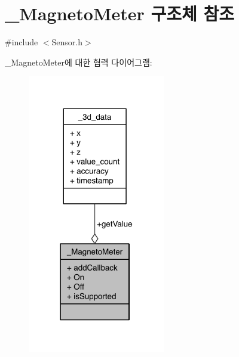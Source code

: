 \hypertarget{struct___magneto_meter}{\section{\-\_\-\-Magneto\-Meter 구조체 참조}
\label{struct___magneto_meter}
}


{\ttfamily \#include $<$Sensor.\-h$>$}



\-\_\-\-Magneto\-Meter에 대한 협력 다이어그램\-:
\nopagebreak
\begin{figure}[H]
\begin{center}
\leavevmode
\includegraphics[width=170pt]{de/d25/struct___magneto_meter__coll__graph}
\end{center}
\end{figure}
